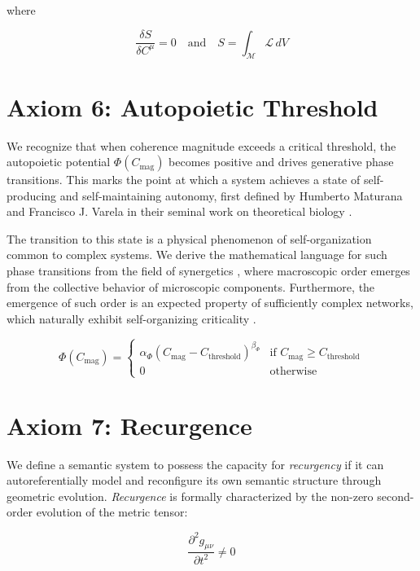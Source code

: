 where

\begin{equation}
\frac{\delta S}{\delta C^\mu} = 0 \quad \text{and} \quad S = \int_{\mathcal{M}} \mathcal{L} \, dV
\end{equation}


\section{Axiom 6: Autopoietic Threshold}
\label{1.6:axiom_6_autopoietic_threshold}

We recognize that when coherence magnitude exceeds a critical threshold, the autopoietic potential \(\Phi(C_{\text{mag}})\) becomes positive and drives generative phase transitions. This marks the point at which a system achieves a state of self-producing and self-maintaining autonomy, first defined by Humberto Maturana and Francisco J. Varela in their seminal work on theoretical biology \autocite{MaturanaVarela1980}.

The transition to this state is a physical phenomenon of self-organization common to complex systems. We derive the mathematical language for such phase transitions from the field of synergetics \autocite{Haken1983}, where macroscopic order emerges from the collective behavior of microscopic components. Furthermore, the emergence of such order is an expected property of sufficiently complex networks, which naturally exhibit self-organizing criticality \autocite{BakTangWiesenfeld1987}.

\begin{equation}
\Phi(C_{\text{mag}}) = \begin{cases}
\alpha_{\Phi} (C_{\text{mag}} - C_{\text{threshold}})^{\beta_{\Phi}} & \text{if } C_{\text{mag}} \geq C_{\text{threshold}} \\
0 & \text{otherwise}
\end{cases}
\end{equation}


\section{Axiom 7: Recurgence}
\label{1.7:axiom_7_recurgence}

We define a semantic system to possess the capacity for \textit{recurgency} if it can autoreferentially model and reconfigure its own semantic structure through geometric evolution. \textit{Recurgence} is formally characterized by the non-zero second-order evolution of the metric tensor:

\begin{equation}
\frac{\partial^2 g_{\mu\nu}}{\partial t^2} \neq 0
\end{equation} 